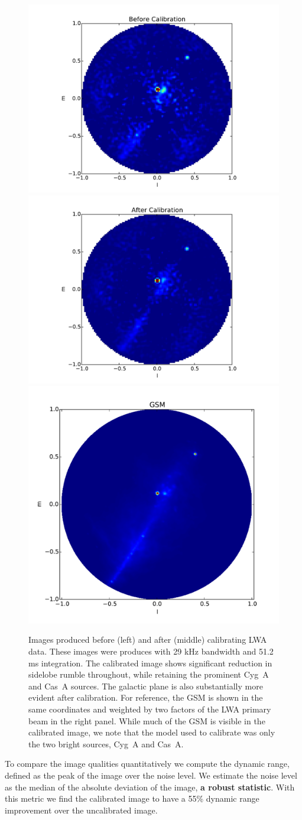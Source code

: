 \documentclass[a4paper,fleqn,usenatbib]{../mnras}
\begin{document}
\begin{figure}
\begin{center}
\includegraphics[width=0.33\linewidth]{figures/cal_paper_data_image_before.pdf}
\includegraphics[width=0.33\linewidth]{figures/cal_paper_data_image_after.pdf}
\includegraphics[width=0.33\linewidth]{figures/cal_paper_gsm_beam_weighted.pdf}
\caption{Images produced before (left) and after (middle) calibrating LWA data. These images were produces with 29 kHz bandwidth and 51.2 ms integration. The calibrated image shows significant reduction in sidelobe rumble throughout, while retaining the prominent Cyg~A and Cas~A sources. The galactic plane is also substantially more evident after calibration. For reference, the GSM is shown in the same coordinates and weighted by two factors of the LWA primary beam in the right panel. While much of the GSM is visible in the calibrated image, we note that the model used to calibrate was only the two bright sources, Cyg~A and Cas~A.
}
\label{fig:data_images}
\end{center}
\end{figure}

To compare the image qualities quantitatively we compute the dynamic range, defined as the peak of the image over the noise level. We estimate the noise level as the median of the absolute deviation of the image, {\bf a robust statistic}. With this metric we find the calibrated image to have a 55\% dynamic range improvement over the uncalibrated image.
\end{document}
